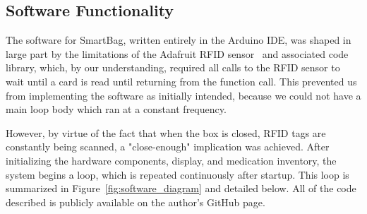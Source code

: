 \documentclass{sigchi}
\begin{document}
\bigskip
\subsection{Software Functionality} \label{software}
The software for SmartBag, written entirely in the Arduino IDE, was shaped
in large part by the limitations of the Adafruit RFID sensor~\cite{rfid_breakout}
and associated code library, which, by our understanding, required all calls to
the RFID sensor to wait until a card is read until returning from the function
call. This prevented us from implementing the software as initially intended,
because we could not have a main loop body which ran at a constant frequency.

However, by virtue of the fact that when the box is closed, RFID tags are
constantly being scanned, a "close-enough" implication was achieved. After
initializing the hardware components, display, and medication inventory,
the system begins a loop, which is repeated continuously after startup. This
loop is summarized in Figure~\ref{fig:software_diagram} and detailed below.
All of the code described is publicly available on the author's GitHub
page.~\cite{github}
\end{document}
